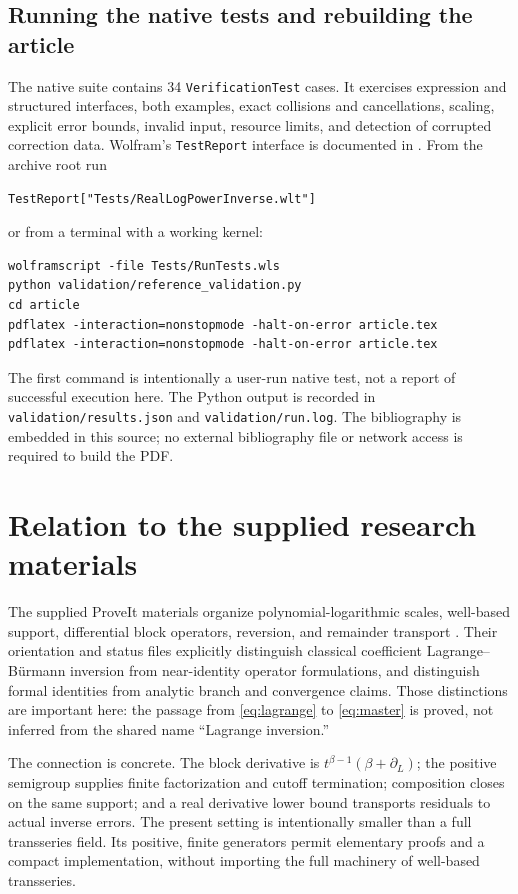 \documentclass[11pt,a4paper]{article}
\theoremstyle{definition}
\begin{document}
\subsection{Running the native tests and rebuilding the article}
The native suite contains 34 \texttt{VerificationTest} cases. It exercises
expression and structured interfaces, both examples, exact collisions and
cancellations, scaling, explicit error bounds, invalid input, resource limits,
and detection of corrupted correction data. Wolfram's \texttt{TestReport}
interface is documented in \cite{testreport}. From the archive root run
\begin{lstlisting}
TestReport["Tests/RealLogPowerInverse.wlt"]
\end{lstlisting}
or from a terminal with a working kernel:
\begin{lstlisting}
wolframscript -file Tests/RunTests.wls
python validation/reference_validation.py
cd article
pdflatex -interaction=nonstopmode -halt-on-error article.tex
pdflatex -interaction=nonstopmode -halt-on-error article.tex
\end{lstlisting}
The first command is intentionally a user-run native test, not a report of
successful execution here. The Python output is recorded in
\texttt{validation/results.json} and \texttt{validation/run.log}.
The bibliography is embedded in this source; no external bibliography file
or network access is required to build the PDF.

\section{Relation to the supplied research materials}\label{sec:related}
The supplied ProveIt materials organize polynomial-logarithmic scales,
well-based support, differential block operators, reversion, and remainder
transport \cite{proveit}. Their orientation and status files explicitly
distinguish classical coefficient Lagrange--B\"urmann inversion from
near-identity operator formulations, and distinguish formal identities from
analytic branch and convergence claims. Those distinctions are important
here: the passage from \eqref{eq:lagrange} to \eqref{eq:master} is proved,
not inferred from the shared name ``Lagrange inversion.''

The connection is concrete. The block derivative is
\(t^{\beta-1}(\beta+\partial_L)\); the positive semigroup supplies finite
factorization and cutoff termination; composition closes on the same support;
and a real derivative lower bound transports residuals to actual inverse
errors. The present setting is intentionally smaller than a full transseries
field. Its positive, finite generators permit elementary proofs and a compact
implementation, without importing the full machinery of well-based
transseries.
\end{document}
